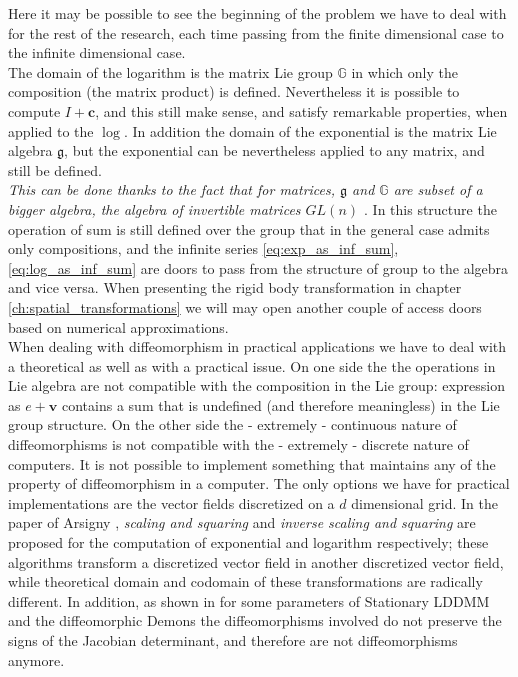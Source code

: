 Here it may be possible to see the beginning of the problem we have to deal with for the rest of the research, each time passing from the finite dimensional case to the infinite dimensional case.\\
The domain of the logarithm is the matrix Lie group $\mathbb{G}$ in which only the composition (the matrix product) is defined. Nevertheless it is possible to compute $I + \mathbf{c}$, and this still make sense, and satisfy remarkable properties, when applied to the $\log$. In addition the domain of the exponential is the matrix Lie algebra $\mathfrak{g}$, but the exponential can be nevertheless applied to any matrix, and still be defined.\\
\emph{This can be done thanks to the fact that for matrices, $\mathfrak{g}$ and $\mathbb{G}$ are subset of a bigger algebra, the algebra of invertible matrices $GL(n)$ \cite{kirillov2008introduction}}. In this structure the operation of sum is still defined over the group that in the general case admits only compositions, and the infinite series \ref{eq:exp_as_inf_sum}, \ref{eq:log_as_inf_sum} are doors to pass from the structure of group to the algebra and vice versa. When presenting the rigid body transformation in chapter \ref{ch:spatial_transformations} we will may open another couple of access doors based on numerical approximations.\\

When dealing with diffeomorphism in practical applications we have to deal with a theoretical as well as with a practical issue.
On one side the
the operations in Lie algebra are not compatible with the composition in the Lie group: expression as $e + \mathbf{v}$ contains a sum that is undefined (and therefore meaningless) in the Lie group structure.
On the other side 
the - extremely - continuous nature of diffeomorphisms is not compatible with the - extremely - discrete nature of computers. It is not possible to implement something that maintains any of the property of diffeomorphism in a computer. The only options we have for practical implementations are the vector fields discretized on a $d$ dimensional grid. In the paper of Arsigny \cite{arsigny2006log}, \emph{scaling and squaring} and \emph{inverse scaling and squaring} are proposed for the computation of exponential and logarithm respectively; these algorithms transform a discretized vector field in another discretized vector field, while theoretical domain and codomain of these transformations are radically different. In addition, as shown in \cite{hernandez2008comparing} for some parameters of Stationary LDDMM and the diffeomorphic Demons the diffeomorphisms involved do not preserve the signs of the Jacobian determinant, and therefore are not diffeomorphisms anymore. \\

